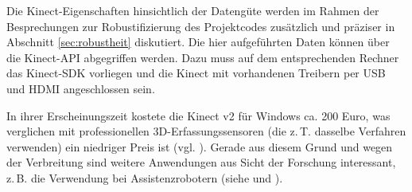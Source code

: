 Die Kinect-Eigenschaften hinsichtlich der Datengüte werden im Rahmen der Besprechungen zur Robustifizierung des Projektcodes zusätzlich und präziser in Abschnitt \ref{sec:robustheit} diskutiert.
Die hier aufgeführten Daten können über die Kinect-API abgegriffen werden. Dazu muss auf dem entsprechenden Rechner das Kinect-SDK vorliegen und die Kinect mit vorhandenen Treibern per USB und HDMI angeschlossen sein.\par 
In ihrer Erscheinungszeit kostete die Kinect v2 für Windows ca. 200 Euro, was verglichen mit professionellen 3D-Erfassungssensoren (die z.\,T. dasselbe Verfahren verwenden) ein niedriger Preis ist (vgl. \cite{heise}). Gerade aus diesem Grund und wegen der Verbreitung sind weitere Anwendungen aus Sicht der Forschung interessant, z.\,B. die Verwendung bei Assistenzrobotern (siehe \cite{thermalsens} und \cite{appearance}).\par 
